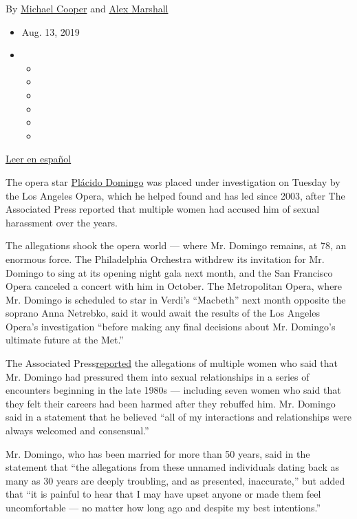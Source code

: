 By \href{https://www.nytimes3xbfgragh.onion/by/michael-cooper}{Michael
Cooper} and
\href{https://www.nytimes3xbfgragh.onion/by/alex-marshall}{Alex
Marshall}

\begin{itemize}
\item
  Aug. 13, 2019
\item
  \begin{itemize}
  \item
  \item
  \item
  \item
  \item
  \item
  \end{itemize}
\end{itemize}

\href{https://www.nytimes3xbfgragh.onion/es/2019/08/13/espanol/cultura/placido-domingo-acusaciones.html}{Leer
en español}

The opera star
\href{https://www.nytimes3xbfgragh.onion/2020/02/25/arts/music/placido-domingo-sexual-misconduct.html}{Plácido
Domingo} was placed under investigation on Tuesday by the Los Angeles
Opera, which he helped found and has led since 2003, after The
Associated Press reported that multiple women had accused him of sexual
harassment over the years.

The allegations shook the opera world --- where Mr. Domingo remains, at
78, an enormous force. The Philadelphia Orchestra withdrew its
invitation for Mr. Domingo to sing at its opening night gala next month,
and the San Francisco Opera canceled a concert with him in October. The
Metropolitan Opera, where Mr. Domingo is scheduled to star in Verdi's
``Macbeth'' next month opposite the soprano Anna Netrebko, said it would
await the results of the Los Angeles Opera's investigation ``before
making any final decisions about Mr. Domingo's ultimate future at the
Met.''

The Associated
Press\href{https://www.apnews.com/c2d51d690d004992b8cfba3bad827ae9}{reported}
the allegations of multiple women who said that Mr. Domingo had
pressured them into sexual relationships in a series of encounters
beginning in the late 1980s --- including seven women who said that they
felt their careers had been harmed after they rebuffed him. Mr. Domingo
said in a statement that he believed ``all of my interactions and
relationships were always welcomed and consensual.''

Mr. Domingo, who has been married for more than 50 years, said in the
statement that ``the allegations from these unnamed individuals dating
back as many as 30 years are deeply troubling, and as presented,
inaccurate,'' but added that ``it is painful to hear that I may have
upset anyone or made them feel uncomfortable --- no matter how long ago
and despite my best intentions.''

